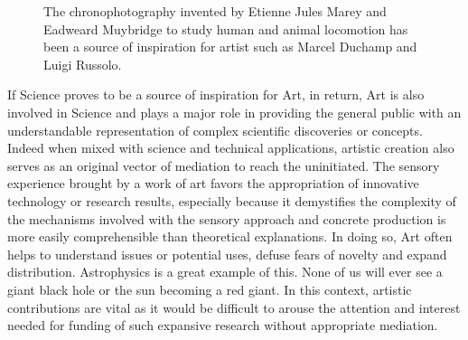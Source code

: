 \begin{figure}[!tb]
\centering


    \hfil
    \caption{The chronophotography invented by Etienne Jules Marey and Eadweard Muybridge to study human and animal locomotion has been a source of inspiration for artist such as Marcel Duchamp and Luigi Russolo.}
    \label{fig:chronophotography_history}
\end{figure}


If Science proves to be a source of inspiration for Art, in return, Art is also involved in Science and plays a major role in providing the general public with an understandable representation of complex scientific discoveries or concepts. Indeed when mixed with science and technical applications, artistic creation also serves as an original vector of mediation to reach the uninitiated. The sensory experience brought by a work of art favors the appropriation of innovative technology or research results, especially because it demystifies the complexity of the mechanisms involved with the sensory approach and concrete production is more easily comprehensible than theoretical explanations. In doing so, Art often helps to understand issues or potential uses, defuse fears of novelty and expand distribution.
Astrophysics is a great example of this. None of us will ever see a giant black hole or the sun becoming a red giant. In this context, artistic contributions are vital as it would be difficult to arouse the attention and interest needed for funding of such expansive research without appropriate mediation.

